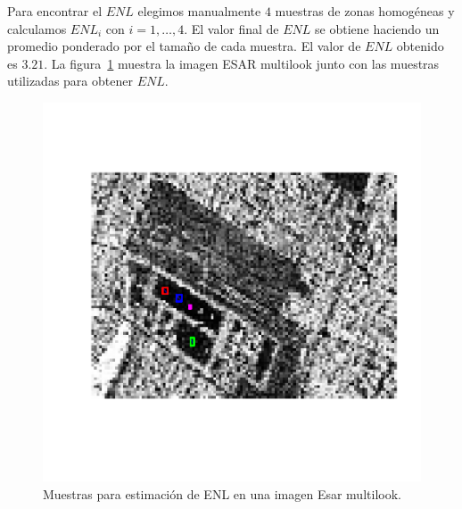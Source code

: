 Para encontrar el $ENL$ elegimos manualmente $4$ muestras de zonas homogéneas y calculamos $ENL_i$ con $i=1,\ldots,4$. El valor final de $ENL$ se obtiene haciendo un promedio ponderado por el tamaño de cada muestra. El valor de $ENL$ obtenido es $3.21$. La figura~\ref{MuestraLooks} muestra la imagen ESAR multilook junto con las muestras utilizadas para obtener $ENL$.

\begin{figure}[htb]
	\centering
	\includegraphics[width=0.8\linewidth]{../../Figures/Tesis/ImagenReal/MuestrasEstimNumLooks.pdf}
	\caption{\label{MuestraLooks}\small Muestras para estimación de ENL en una imagen Esar multilook.}
\end{figure}

